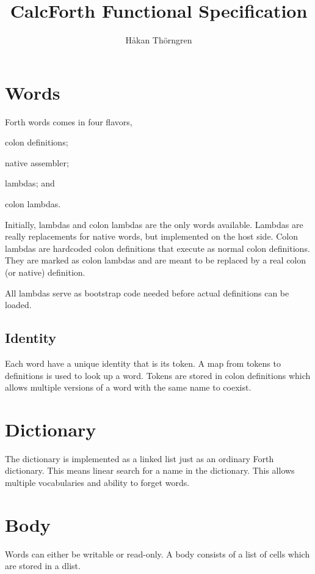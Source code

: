 \documentclass[a4paper]{article}
\begin{document}
\title{CalcForth Functional Specification}
\author{Håkan Thörngren}

 \maketitle


\section{Words}
Forth words comes in four flavors,
\begin{inparaenum}[\itshape 1\upshape)]
\item colon definitions;
\item native assembler;
\item lambdas; and
\item colon lambdas.
\end{inparaenum}

Initially, lambdas and colon lambdas are the only words available. Lambdas are really replacements for native words, but implemented on the host side. Colon lambdas are hardcoded colon definitions that execute as normal colon definitions. They are marked as colon lambdas and are meant to be replaced by a real colon (or native) definition.

All lambdas serve as bootstrap code needed before actual definitions can be loaded.

\subsection{Identity}
Each word have a unique identity that is its token. A map from tokens to definitions is used to look up a word. Tokens are stored in colon definitions which allows multiple versions of a word with the same name to coexist.

\section{Dictionary}
The dictionary is implemented as a linked list just as an ordinary Forth dictionary. This means linear search for a name in the dictionary. This allows multiple vocabularies and ability to forget words.

\section{Body}
Words can either be writable or read-only. A body consists of a list of cells which are stored in a dlist.
\end{document}
